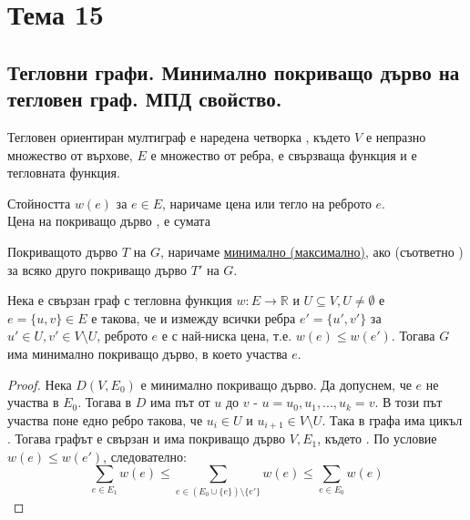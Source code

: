 \section{Тема 15}

\subsection{Тегловни графи. Минимално покриващо дърво на тегловен граф. МПД свойство.}
\begin{definition}
    Тегловен ориентиран мултиграф е наредена четворка , където \(V\) е непразно 
    множество от върхове, \(E\) е множество от ребра,  
    е свързваща функция и  е тегловната функция.
\end{definition}

\begin{note}
    Стойността \(w(e)\) за \(e \in E\), наричаме цена или тегло на реброто \(e\). \\
    Цена на покриващо дърво , е сумата 
\end{note}

\begin{definition}
    Покриващото дърво \(T\) на \(G\), наричаме \underline{минимално (максимално)}, ако 
     (съответно ) за всяко друго покриващо дърво \(T'\) на \(G\).
\end{definition}

\begin{theorem}
    Нека \graf е свързан граф с тегловна функция \(w: E \to \mathbb{R}\) и \(U \subseteq V, U \not = 
    \emptyset\) е \(e = \{u, v\} \in E\) е такова, че  и измежду
    всички ребра \(e' = \{u', v'\}\) за \(u' \in U, v' \in V \setminus U\), реброто \(e\) е с 
    най-ниска цена, т.е. \(w(e) \le w(e')\). Тогава \(G\) има минимално покриващо дърво, в което 
    участва \(e\).
\end{theorem}

\begin{proof}
    Нека \(D(V, E_0)\) е минимално покриващо дърво. Да допуснем, че \(e\) не участва в \(E_0\). Тогава в 
    \(D\) има път от \(u\) до \(v\) - \(u = u_0, u_1, ..., u_k = v\). В този път участва поне едно ребро 
     такова, че \(u_i \in U\) и \(u_{i + 1} \in V \setminus U\). Така в 
    графа  има цикъл . Тогава 
    графът  е свързан и има покриващо дърво \(V, E_1\), 
    където . По условие \(w(e) \le w(e')\), 
    следователно:
    \begin{equation*}
        \sum_{e \in E_1} w(e) \le \sum_{e \in (E_0 \cup \{e\}) \setminus \{e'\}} w(e) \le 
        \sum_{e \in E_0} w(e)
    \end{equation*}
\end{proof}

